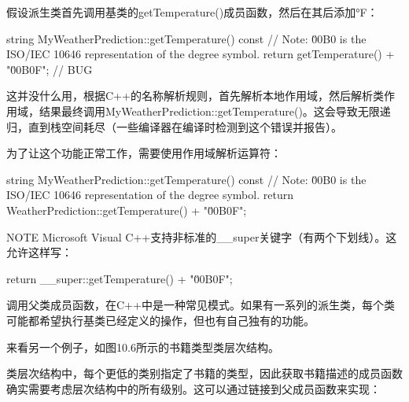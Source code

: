 假设派生类首先调用基类的getTemperature()成员函数，然后在其后添加°F：

\begin{cpp}
string MyWeatherPrediction::getTemperature() const
{
    // Note: \u00B0 is the ISO/IEC 10646 representation of the degree symbol.
    return getTemperature() + "\u00B0F"; // BUG
}
\end{cpp}

这并没什么用，根据C++的名称解析规则，首先解析本地作用域，然后解析类作用域，结果最终调用MyWeatherPrediction::getTemperature()。这会导致无限递归，直到栈空间耗尽（一些编译器在编译时检测到这个错误并报告）。

为了让这个功能正常工作，需要使用作用域解析运算符：

\begin{cpp}
string MyWeatherPrediction::getTemperature() const
{
    // Note: \u00B0 is the ISO/IEC 10646 representation of the degree symbol.
    return WeatherPrediction::getTemperature() + "\u00B0F";
}
\end{cpp}

\begin{myNotic}{NOTE}
Microsoft Visual C++支持非标准的\_\_super关键字（有两个下划线）。这允许这样写：

\begin{cpp}
return __super::getTemperature() + "\u00B0F";
\end{cpp}
\end{myNotic}

调用父类成员函数，在C++中是一种常见模式。如果有一系列的派生类，每个类可能都希望执行基类已经定义的操作，但也有自己独有的功能。

来看另一个例子，如图10.6所示的书籍类型类层次结构。


类层次结构中，每个更低的类别指定了书籍的类型，因此获取书籍描述的成员函数确实需要考虑层次结构中的所有级别。这可以通过链接到父成员函数来实现：

